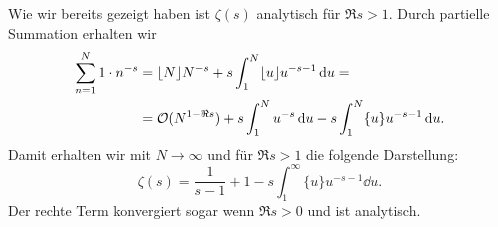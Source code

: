 \begin{remark}
    Wie wir bereits gezeigt haben ist $\zeta(s)$ analytisch für $\Re s > 1$. Durch partielle Summation erhalten wir
    \begin{align*}
        \sum_{n=1}^N 1 \cdot n^{-s} &= \lfloor N \rfloor N^{-s} + s \int_1^N \lfloor u \rfloor u^{-s-1} \mathop{}\!\mathrm{d} u = \\
        &= \mathcal{O}(N^{1 - \Re s}) + s \int_1^N u^{-s} \mathop{}\!\mathrm{d} u - s \int_1^N \{ u \} u^{-s-1} \mathop{}\!\mathrm{d} u.
    \end{align*}
    Damit erhalten wir mit $N \to \infty$ und für $\Re s > 1$ die folgende Darstellung:
    $$ \zeta(s) = \frac{1}{s-1} + 1 - s \int_1^\infty \{ u \} u^{-s-1} \dd u. $$
    Der rechte Term konvergiert sogar wenn $\Re s > 0$ und ist analytisch.
\end{remark}